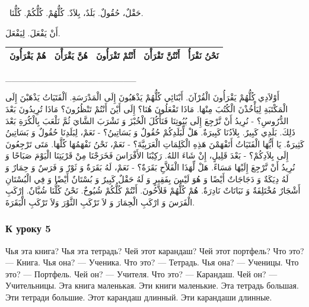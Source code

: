 \documentclass[a5paper]{article}
\begin{document}
\ حَقْلٌ، حُقُولٌ. بَلَدٌ، بِلاَدٌ. كُلُّهُمْ. كُلُّكُمْ. كُلُّنَا.

أَنْ يَفْعَلَ. لِيَفْعَلَ.

\begin{center}
\tablefirsthead{}
\tablehead{}
\tabletail{}
\tablelasttail{}
\begin{supertabular}{|m{1.2962599in}|m{1.1712599in}|m{1.4212599in}|m{1.2962599in}|m{1.1920599in}|}
\hline
هُمْ يَقْرَأُونَ &
هُنَّ يَقْرَأْنَ &
أَنْتُمْ تَقْرَأُونَ &
أَنْتُنَّ تَقْرَأْنَ &
نَحْنُ نَقْرَأُ\\\hline
\end{supertabular}
\end{center}
\_\_\_\_\_\_\_\_\_\_\_\_\_\_\_\_\_\_\_\_\_

أَوْلاَدِي كُلُّهُمْ يَقْرَأُونَ الْقُرْآنَ. أَبْنَائِي كُلُّهُمْ يَذْهَبُونَ إِلَى الْمَدْرَسَةِ. اَلْفَتَيَاتُ يَذْهَبْنَ إِلَى الْمَكْتَبَةِ لِيَأْخُذْنَ الْكُتُبَ مِنْهَا. مَاذَا تَفْعَلُونَ هُنَا؟ إِلَى أَيْنَ أَنْتُمْ تَنْظُرُونَ؟ مَاذَا تُرِيدُونَ بَعْدَ الدُّرُوسِ؟ - نُرِيدُ أَنْ نَّرْجِعَ إِلَى بُيُوتِنَا فَنَأْكُلَ الْخُبْزَ وَ نَشْرَبَ الشَّايَ ثُمَّ نَلْعَبَ بِالْكُرَةِ بَعْدَ ذَلِكَ. بَلَدِي كَبِيرٌ. بِلاَدُنَا كَبِيرَةٌ. هَلْ لِّبَلَدِكُمْ حُقُولٌ وَ بَسَاتِينُ؟ - نَعَمْ، لِبَلَدِنَا حُقُولٌ وَ بَسَاتِينُ كَثِيرَةٌ. يَا أَيُّهَا الْفَتَيَاتُ أَتَفْهَمْنَ هَذِهِ الْكَلِمَاتِ الْعَرَبِيَّةَ؟ - نَعَمْ، نَحْنُ نَفْهَمُهَا كُلَّهَا. مَتَى تَرْجِعُونَ إِلَى بِلاَدِكُمْ؟ - بَعْدَ قَلِيلٍ، إِنْ شَاءَ اللهُ. رَكِبْنَا الأَفْرَاسَ فَخَرَجْنَا مِنْ قَرْيَتِنَا الْيَوْمَ صَبَاحًا وَ نُرِيدُ أَنْ نَّرْجِعَ إِلَيْهَا مَسَاءً. هَلْ لِّهَذَا الْفَلاَّحِ بَقَرَةٌ؟ - نَعَمْ، لَهُ بَقَرَةٌ وَ ثَوْرٌ وَ فَرَسٌ وَ حِمَارٌ وَ لَهُ دِيَكَةٌ وَ دَجَاجَاتٌ أَيْضًا وَ هُوَ لَيْسَ بِفَقِيرٍ وَ لَهُ حَقْلٌ كَبِيرٌ وَ بُسْتَانٌ أَيْضًا وَ فِي الْبُسْتَانِ أَشْجَارٌ مُخْتَلِفَةٌ وَ نَبَاتَاتٌ نَادِرَةٌ. هُمْ كُلُّهُمْ فَلاَّحُونَ. أَنْتُمْ كُلُّكُمْ شُيُوخٌ. نَحْنُ كُلُّنَا شُبَّانٌ. إِرْكَبِ الْفَرَسَ وَ ارْكَبِ الْحِمَارَ وَ لاَ تَرْكَبِ الثَّوْرَ وَلاَ تَرْكَبِ الْبَقَرَةَ.

\subsubsection{К уроку 5}
Чья эта книга? Чья эта тетрадь? Чей этот карандаш? Чей этот портфель? Что это? — Книга. Чья она? — Ученика. Что это? — Тетрадь. Чья она? — Ученицы. Что это? — Портфель. Чей он? — Учителя. Что это? — Карандаш. Чей он? — Учительницы. Эта книга маленькая. Эти книги маленькие. Эта тетрадь большая. Эти тетради большие. Этот карандаш длинный. Эти карандаши длинные.
\end{document}
